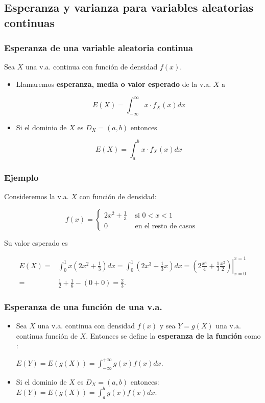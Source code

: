\subsection{Esperanza y varianza para variables aleatorias continuas}

\begin{frame}
\frametitle{Esperanza de una variable aleatoria continua}
Sea $X$ una v.a. continua con función de densidad $f(x)$.
\begin{itemize}
\item Llamaremos \textbf{esperanza, media o valor esperado}  de la v.a. $X$ a 

           $$E(X)=\int_{-\infty}^{\infty}x \cdot f_{X}(x) dx$$
\item Si el  dominio de $X$ es  $D_X=(a,b)$ entonces

 $$E(X)=\int_{a}^{b}x \cdot f_{X}(x) dx$$ 
\end{itemize}
\end{frame}

\begin{frame}
\frametitle{Ejemplo}
Consideremos la v.a. $X$  con función de densidad:

$$
f(x)=\left\{\begin{array}{ll} 2 x^2+\frac{1}{3} &\mbox{ si } 0 <x<1 \\
0 & \mbox{ en el resto de casos } 
 \end{array}\right.
$$


Su valor esperado es 

\[
\begin{array}{rl}
E(X)= & \int_{0}^1 x \left(2 x^2 +\frac{1}{3}\right) dx= \int_{0}^1 \left(2 x^3 +\frac{1}{3}x\right) dx=
\left.\left(2 \frac{x^4}{4}+\frac{1}{3} \frac{x^2}{2}\right)\right|_{x=0}^{x=1} \\ = & \frac{1}{2}+\frac{1}{6}-(0+0)=\frac{2}{3}.
\end{array}
\]

\end{frame}




\begin{frame}
\frametitle{Esperanza de una función de una v.a.}
\begin{itemize}
\item  Sea $X$ una v.a. continua con densidad $f(x)$ y sea  $Y=g(X)$ una v.a. continua funci\'on de $X$. Entonces se define la \textbf{esperanza de la función} como :

$E(Y)=E(g(X))=\int_{-\infty}^{+\infty} g(x) f(x)dx$.
\item  Si el dominio de $X$ es $D_X=(a,b)$ entonces:
$E(Y)=E(g(X))=\int_{a}^{b} g(x) f(x)dx$.
\end{itemize}
\end{frame}


